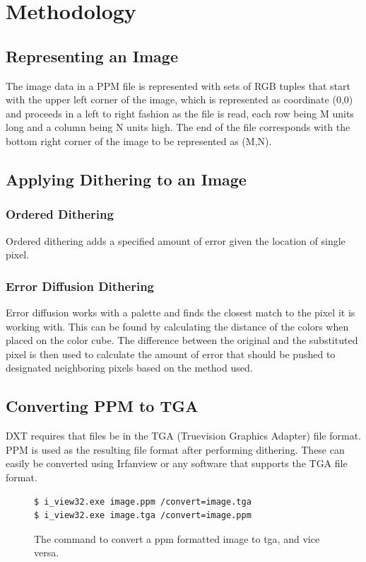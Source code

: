 \documentclass[12pt]{article}
\begin{document}
\section{Methodology}

\subsection{Representing an Image}
The image data in a PPM file is represented with sets of RGB tuples that start with the upper left corner of the image, which is represented as coordinate (0,0) and proceeds in a left to right fashion as the file is read, each row being M units long and a column being N units high. The end of the file corresponds with the bottom right corner of the image to be represented as (M,N).

\subsection{Applying Dithering to an Image}
\subsubsection{Ordered Dithering}
Ordered dithering adds a specified amount of error given the location of single pixel.

\subsubsection{Error Diffusion Dithering}
Error diffusion works with a palette and finds the closest match to the pixel it is working with. This can be found by calculating the distance of the colors when placed on the color cube. The difference between the original and the substituted pixel is then used to calculate the amount of error that should be pushed to designated neighboring pixels based on the method used.

\subsection{Converting PPM to TGA}
DXT requires that files be in the TGA (Truevision Graphics Adapter) file format. PPM is used as the resulting file format after performing dithering. These can easily be converted using Irfanview or any software that supports the TGA file format.

\begin{center}
\begin{figure}[!htbp]
\begin{verbatim}
$ i_view32.exe image.ppm /convert=image.tga
$ i_view32.exe image.tga /convert=image.ppm
\end{verbatim}
\caption{The command to convert a ppm formatted image to tga, and vice versa.}
\end{figure}
\end{center}
\end{document}
